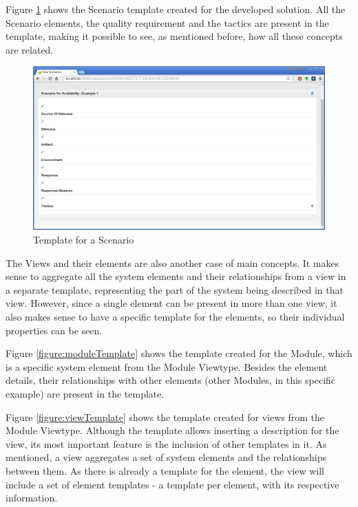 Figure \ref{figure:scenarioTemplate} shows the Scenario template created for the developed solution. All the Scenario elements, the quality requirement and the tactics are present in the template, making it possible to see, as mentioned before, how all these concepts are related.
\begin{figure}
\includegraphics[width=15cm]{images/scenarioTemplate}
\centering
\caption{Template for a Scenario}
\label{figure:scenarioTemplate}
\end{figure}

The Views and their elements are also another case of main concepts. It makes sense to aggregate all the system elements and their relationships from a view in a separate template, representing the part of the system being described in that view. However, since a single element can be present in more than one view, it also makes sense to have a specific template for the elements, so their individual properties can be seen.

Figure \ref{figure:moduleTemplate} shows the template created for the Module, which is a specific system element from the Module Viewtype. Besides the element details, their relationships with other elements (other Modules, in this specific example) are present in the template.

Figure \ref{figure:viewTemplate} shows the template created for views from the Module Viewtype. Although the template allows inserting a description for the view, its most important feature is the inclusion of other templates in it. As mentioned, a view aggregates a set of system elements and the relationships between them. As there is already a template for the element, the view will include a set of element templates - a template per element, with its respective information.

